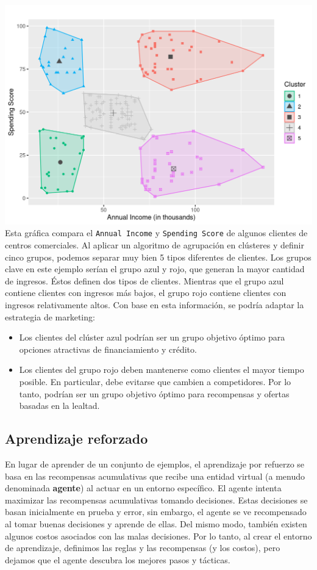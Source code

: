 \documentclass[
]{book}
\providecommand{\tightlist}{%
  \setlength{\itemsep}{0pt}\setlength{\parskip}{0pt}}
\begin{document}
\includegraphics{img/cluster.png}
Esta gráfica compara el \texttt{Annual\ Income} y \texttt{Spending\ Score} de algunos clientes de centros comerciales. Al aplicar un algoritmo de agrupación en clústeres y definir cinco grupos, podemos separar muy bien 5 tipos diferentes de clientes. Los grupos clave en este ejemplo serían el grupo azul y rojo, que generan la mayor cantidad de ingresos. Éstos definen dos tipos de clientes. Mientras que el grupo azul contiene clientes con ingresos más bajos, el grupo rojo contiene clientes con ingresos relativamente altos. Con base en esta información, se podría adaptar la estrategia de marketing:

\begin{itemize}
\tightlist
\item
  Los clientes del clúster azul podrían ser un grupo objetivo óptimo para opciones atractivas de financiamiento y crédito.
\item
  Los clientes del grupo rojo deben mantenerse como clientes el mayor tiempo posible. En particular, debe evitarse que cambien a competidores. Por lo tanto, podrían ser un grupo objetivo óptimo para recompensas y ofertas basadas en la lealtad.
\end{itemize}

\hypertarget{aprendizaje-reforzado}{%
\subsection{Aprendizaje reforzado}\label{aprendizaje-reforzado}}

En lugar de aprender de un conjunto de ejemplos, el aprendizaje por refuerzo se basa en las recompensas acumulativas que recibe una entidad virtual (a menudo denominada \textbf{agente}) al actuar en un entorno específico. El agente intenta maximizar las recompensas acumulativas tomando decisiones. Estas decisiones se basan inicialmente en prueba y error, sin embargo, el agente se ve recompensado al tomar buenas decisiones y aprende de ellas. Del mismo modo, también existen algunos costos asociados con las malas decisiones. Por lo tanto, al crear el entorno de aprendizaje, definimos las reglas y las recompensas (y los costos), pero dejamos que el agente descubra los mejores pasos y tácticas.
\end{document}
